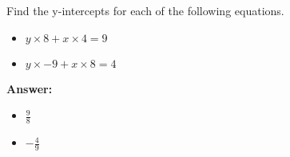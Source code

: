  Find the y-intercepts for each of the following equations. \begin{itemize}\item \( y \times 8 + x \times 4 = 9 \)\item \( y \times -9 + x \times 8 = 4 \)\end{itemize}

        \textbf{Answer:} \begin{itemize}\item \( \frac{9}{8} \)\item \( -\frac{4}{9} \)\end{itemize}
